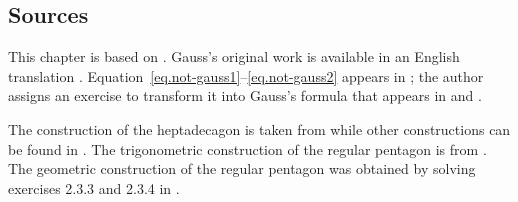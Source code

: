 \subsection*{Sources}

This chapter is based on \cite{jorg}. Gauss's original work is available in an English translation \cite{gauss}.
Equation~\ref{eq.not-gauss1}--\ref{eq.not-gauss2} appears in \cite{rike}; the author assigns an exercise to transform it into Gauss's formula that appears in \cite[p.~458]{gauss} and \cite[p.~68]{jorg}.

The construction of the heptadecagon is taken from \cite{callagy} while other constructions can be found in \cite{wiki:heptadecagon}. The trigonometric construction of the regular pentagon is from \cite{wiki:pentagon}. The geometric construction of the regular pentagon was obtained by solving exercises 2.3.3 and 2.3.4 in \cite{stillwell}.

